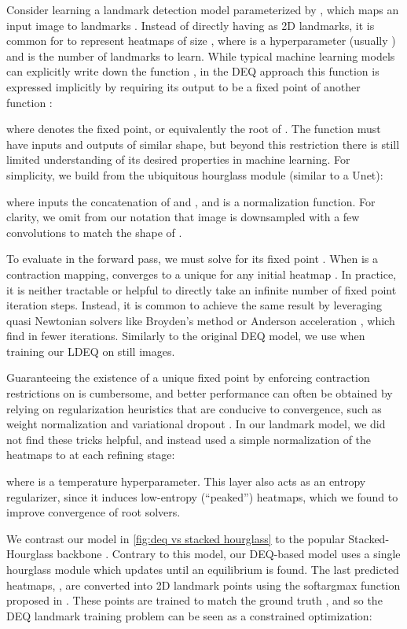 \documentclass[10pt,twocolumn,letterpaper]{article}
\begin{document}
Consider learning a landmark detection model  parameterized by , which maps an input image  to landmarks . Instead of directly having  as 2D landmarks, it is common for  to represent  heatmaps of size , where  is a hyperparameter (usually ) and  is the number of landmarks to learn. While typical machine learning models can explicitly write down the function , in the DEQ approach this function is expressed implicitly by requiring its output to be a fixed point of another function :

where  denotes the fixed point, or equivalently the root of . The function  must have inputs and outputs of similar shape, but beyond this restriction there is still limited understanding of its desired properties in machine learning. For simplicity, we build  from the ubiquitous hourglass module  (similar to a Unet): 

where  inputs the concatenation of  and , and  is a normalization function. For clarity, we omit from our notation that image  is downsampled with a few convolutions to match the shape of . 

To evaluate  in the forward pass, we must solve for its fixed point . When  is a contraction mapping,  converges to a unique  for any initial heatmap . In practice, it is neither tractable or helpful to directly take an infinite number of fixed point iteration steps. Instead, it is common to achieve the same result by leveraging quasi Newtonian solvers like Broyden's method \cite{Broyden1965ACO} or Anderson acceleration \cite{Anderson1965IterativeProcedure}, which find  in fewer iterations. Similarly to the original DEQ model, we use  when training our LDEQ on still images.

Guaranteeing the existence of a unique fixed point by enforcing contraction restrictions on  is cumbersome, and better performance can often be obtained by relying on regularization heuristics that are conducive to convergence, such as weight normalization and variational dropout \cite{Bai2020MDEQs}. In our landmark model, we did not find these tricks helpful, and instead used a simple normalization of the heatmaps to  at each refining stage:

where  is a temperature hyperparameter. This layer also acts as an entropy regularizer, since it induces low-entropy (``peaked'') heatmaps, which we found to improve convergence of root solvers. 

We contrast our model in \cref{fig:deq vs stacked hourglass} to the popular Stacked-Hourglass backbone \cite{Newell2016StackedHourglass}. Contrary to this model, our DEQ-based model uses a single hourglass module which updates  until an equilibrium is found. The last predicted heatmaps, , are converted into 2D landmark points  using the softargmax function  proposed in \cite{Luvizon2017SoftArgmax}. These points are trained to match the ground truth , and so the DEQ landmark training problem can be seen as a constrained optimization:
\end{document}
